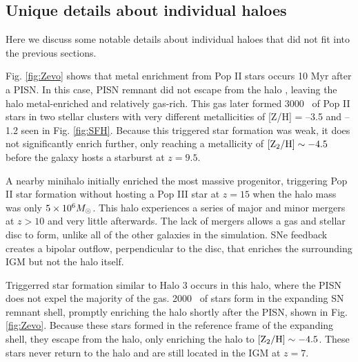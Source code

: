 \documentclass[useAMS,usenatbib]{mn2e}
\begin{document}

\subsection{Unique details about individual haloes}

Here we discuss some notable details about individual haloes that did
not fit into the previous sections.

 Fig. \ref{fig:Zevo} shows that metal enrichment from Pop II
stars occurs 10 Myr after a PISN.  In this case, PISN remnant did not
escape from the halo \citep[cf.][]{Whalen08_SN}, leaving the halo
metal-enriched and relatively gas-rich.  This gas later formed 3000
\Ms~of Pop II stars in two stellar clusters with very different
metallicities of [Z/H] = --3.5 and --1.2 seen in Fig. \ref{fig:SFH}.
Because this triggered star formation was weak, it does not
significantly enrich further, only reaching a metallicity of $\ztwo
\sim -4.5$ before the galaxy hosts a starburst at $z = 9.5$.

 A nearby minihalo initially enriched the most massive
progenitor, triggering Pop II star formation without hosting a Pop III
star at $z=15$ when the halo mass was only $5 \times 10^6 \Ms$.  This
halo experiences a series of major and minor mergers at $z > 10$ and
very little afterwards.  The lack of mergers allows a gas and stellar
disc to form, unlike all of the other galaxies in the simulation.  SNe
feedback creates a bipolar outflow, perpendicular to the disc, that
enriches the surrounding IGM but not the halo itself.

 Triggerred star formation similar to Halo 3 occurs in this
halo, where the PISN does not expel the majority of the gas.  2000
\Ms~of stars form in the expanding SN remnant shell, promptly
enriching the halo shortly after the PISN, shown in
Fig. \ref{fig:Zevo}.  Because these stars formed in the reference
frame of the expanding shell, they escape from the halo, only
enriching the halo to $\ztwo \sim -4.5$.  These stars never return to
the halo and are still located in the IGM at $z=7$.
\end{document}
